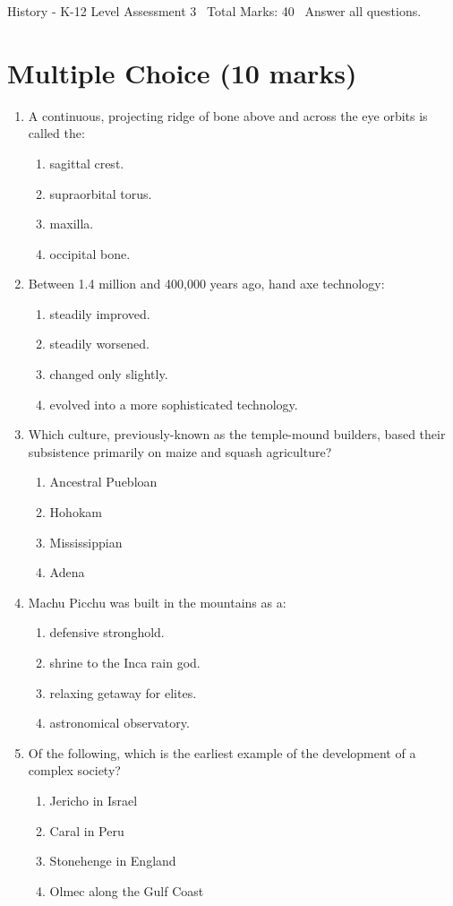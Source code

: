\documentclass[12pt]{article}
\begin{document}
\begin{center}
History - K-12 Level Assessment 3 \
Total Marks: 40 \
Answer all questions.
\end{center}

\section*{Multiple Choice (10 marks)}
\begin{enumerate}[label=\arabic*.]
\item A continuous, projecting ridge of bone above and across the eye orbits is called the:
\begin{enumerate}[label=(\alph*)]
    \item sagittal crest.
    \item supraorbital torus.
    \item maxilla.
    \item occipital bone.
\end{enumerate}
\item Between 1.4 million and 400,000 years ago, hand axe technology:
\begin{enumerate}[label=(\alph*)]
    \item steadily improved.
    \item steadily worsened.
    \item changed only slightly.
    \item evolved into a more sophisticated technology.
\end{enumerate}
\item Which culture, previously-known as the temple-mound builders, based their subsistence
primarily on maize and squash agriculture?
\begin{enumerate}[label=(\alph*)]
    \item Ancestral Puebloan
    \item Hohokam
    \item Mississippian
    \item Adena
\end{enumerate}
\item Machu Picchu was built in the mountains as a:
\begin{enumerate}[label=(\alph*)]
    \item defensive stronghold.
    \item shrine to the Inca rain god.
    \item relaxing getaway for elites.
    \item astronomical observatory.
\end{enumerate}
\item Of the following, which is the earliest example of the development of a complex society?
\begin{enumerate}[label=(\alph*)]
    \item Jericho in Israel
    \item Caral in Peru
    \item Stonehenge in England
    \item Olmec along the Gulf Coast
\end{enumerate}
\end{enumerate}
\end{document}
